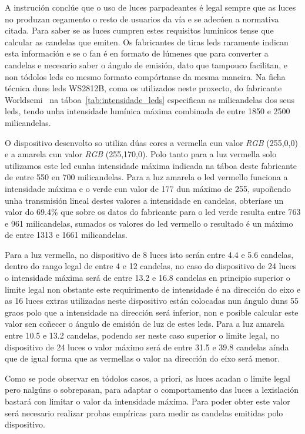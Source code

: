 A instrución conclúe que o uso de luces parpadeantes é legal sempre que as luces no produzan cegamento o resto de usuarios da vía e se adecúen a normativa citada.
Para saber se as luces cumpren estes requisitos lumínicos tense que calcular as candelas que emiten. Os fabricantes de tiras leds raramente indican esta información e se o fan é en formato de lúmenes que para converter a candelas e necesario saber o ángulo de emisión, dato que tampouco facilitan, e non tódolos leds co mesmo formato compórtanse da mesma maneira. Na ficha técnica duns leds WS2812B, coma os utilizados neste proxecto, do fabricante Worldsemi~\cite{WS2812BDatasheet} na táboa~\ref{tab:intensidade_leds} especifican as milicandelas dos seus leds, tendo unha intensidade lumínica máxima combinada de entre 1850 e 2500 milicandelas.

O dispositivo desenvolto so utiliza dúas cores a vermella cun valor \emph{RGB} (255,0,0) e a amarela cun valor \emph{RGB}  (255,170,0). Polo tanto para a luz vermella solo utilizamos este led cunha intensidade máxima indicada na táboa deste fabricante de entre 550 en 700 milicandelas. Para a luz amarela o led vermello funciona a intensidade máxima e o verde cun valor de 177 dun máximo de 255, supoñendo unha transmisión lineal destes valores a intensidade en candelas, obteríase un valor do 69.4\(\%\) que sobre os datos do fabricante para o led verde resulta entre 763 e 961 milicandelas, sumados os valores do led vermello o resultado é un máximo de entre 1313 e 1661 milicandelas.

Para a luz vermella, no dispositivo de 8 luces isto serán entre 4.4 e 5.6 candelas, dentro do rango legal de entre 4 e 12 candelas, no caso do dispositivo de 24 luces o intensidade máxima será de entre 13.2 e 16.8 candelas en principio superior o limite legal non obstante este requirimento de intensidade é na dirección do eixo e as 16 luces extras utilizadas neste dispositivo están colocadas nun ángulo duns 55 graos polo que a intensidade na dirección será inferior, non e posible calcular este valor sen coñecer o ángulo de emisión de luz de estes leds.
Para a luz amarela entre 10.5 e 13.2 candelas, podendo ser neste caso superior o limite legal, no dispositivo de 24 luces o valor máximo será de entre 31.5 e 39.8 candelas aínda que de igual forma que as vermellas o valor na dirección do eixo será menor.

Como se pode observar en tódolos casos, a priori, as luces acadan o limite legal pero nalgúns o sobrepasan, para adaptar o comportamento das luces a lexislación bastará con limitar o valor da intensidade máxima. Para poder obter este valor será necesario realizar probas empíricas para medir as candelas emitidas polo dispositivo.

